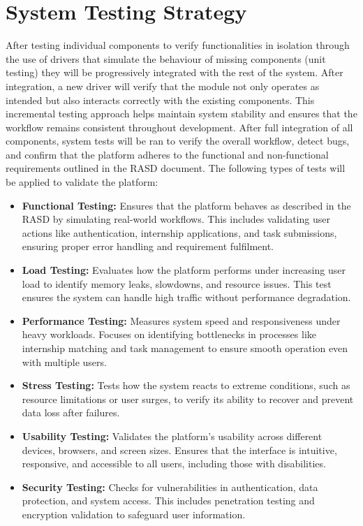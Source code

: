 \section{System Testing Strategy}
After testing individual components to verify functionalities in isolation through the use of drivers that simulate the behaviour of missing components (unit testing) they will be progressively integrated with the rest of the system. After integration, a new driver will verify that the module not only operates as intended but also interacts correctly with the existing components. This incremental testing approach helps maintain system stability and ensures that the workflow remains consistent throughout development. After full integration of all components, system tests will be ran to verify the overall workflow, detect bugs, and confirm that the platform adheres to the functional and non-functional requirements outlined in the RASD document.
The following types of tests will be applied to validate the platform:

\begin{itemize}
    \item \textbf{Functional Testing:} Ensures that the platform behaves as described in the RASD by simulating real-world workflows. This includes validating user actions like authentication, internship applications, and task submissions, ensuring proper error handling and requirement fulfilment.
    \item \textbf{Load Testing:} Evaluates how the platform performs under increasing user load to identify memory leaks, slowdowns, and resource issues. This test ensures the system can handle high traffic without performance degradation.
    \item \textbf{Performance Testing:} Measures system speed and responsiveness under heavy workloads. Focuses on identifying bottlenecks in processes like internship matching and task management to ensure smooth operation even with multiple users.
    \item \textbf{Stress Testing:} Tests how the system reacts to extreme conditions, such as resource limitations or user surges, to verify its ability to recover and prevent data loss after failures.
    \item \textbf{Usability Testing:} Validates the platform’s usability across different devices, browsers, and screen sizes. Ensures that the interface is intuitive, responsive, and accessible to all users, including those with disabilities.
    \item \textbf{Security Testing:} Checks for vulnerabilities in authentication, data protection, and system access. This includes penetration testing and encryption validation to safeguard user information.
\end{itemize}